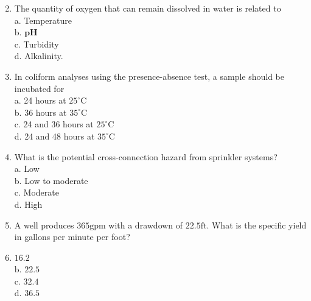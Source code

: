 \documentclass[10pt]{article}
\begin{document}
\begin{enumerate}
  \setcounter{enumi}{1}
  \item The quantity of oxygen that can remain dissolved in water is related to\\
a. Temperature\\
b. $\mathbf{p H}$\\
c. Turbidity\\
d. Alkalinity.

  \item In coliform analyses using the presence-absence test, a sample should be incubated for\\
a. 24 hours at $25^{\circ} \mathrm{C}$\\
b. 36 hours at $35^{\circ} \mathrm{C}$\\
c. 24 and 36 hours at $25^{\circ} \mathrm{C}$\\
d. 24 and 48 hours at $35^{\circ} \mathrm{C}$

  \item What is the potential cross-connection hazard from sprinkler systems?\\
a. Low\\
b. Low to moderate\\
c. Moderate\\
d. High

  \item A well produces $365 \mathrm{gpm}$ with a drawdown of $22.5 \mathrm{ft}$. What is the specific yield in gallons per minute per foot?

  \item $16.2$\\
b. $22.5$\\
c. $32.4$\\
d. $36.5$

\end{enumerate}
\end{document}
